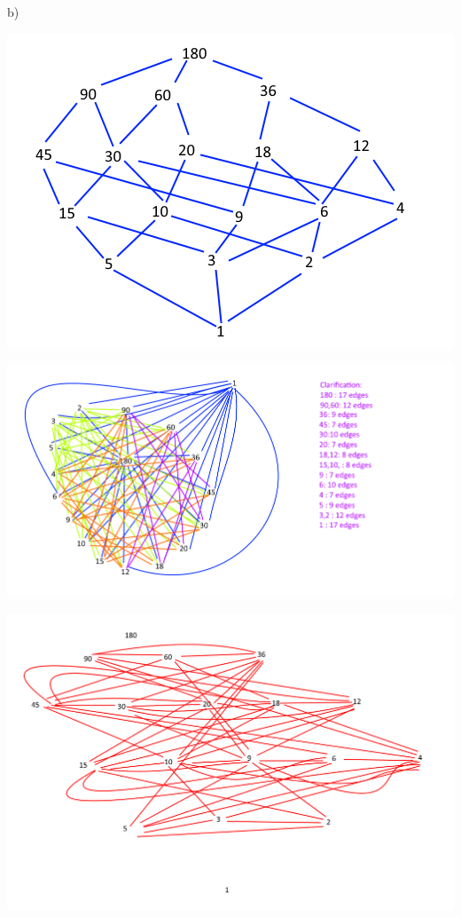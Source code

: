 \documentclass{article}
\begin{document}
b)

\includegraphics[scale=0.4]{HW12_2b.png}

\includegraphics[scale=0.6]{HW12_2b2.png}

\includegraphics[scale=0.4]{HW12_2b3.png}
\end{document}
